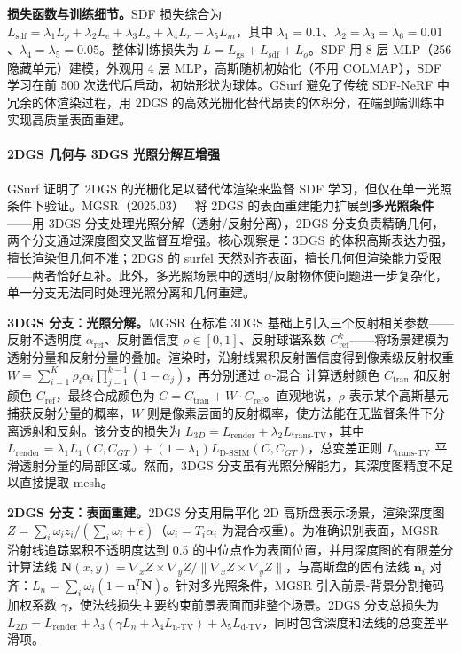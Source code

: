 \textbf{损失函数与训练细节。}SDF 损失综合为 $L_\text{sdf}=\lambda_1 L_p+\lambda_2 L_e+\lambda_3 L_s+\lambda_4 L_r+\lambda_5 L_m$，其中 $\lambda_1=0.1$、$\lambda_2=\lambda_3=\lambda_6=0.01$、$\lambda_4=\lambda_5=0.05$。整体训练损失为 $L=L_\text{gs}+L_\text{sdf}+L_o$。SDF 用 8 层 MLP（256 隐藏单元）建模，外观用 4 层 MLP，高斯随机初始化（不用 COLMAP），SDF 学习在前 500 次迭代后启动，初始形状为球体。GSurf 避免了传统 SDF-NeRF 中冗余的体渲染过程，用 2DGS 的高效光栅化替代昂贵的体积分，在端到端训练中实现高质量表面重建。

\paragraph{2DGS 几何与 3DGS 光照分解互增强}

GSurf 证明了 2DGS 的光栅化足以替代体渲染来监督 SDF 学习，但仅在单一光照条件下验证。MGSR（2025.03）~\cite{2503_05182} 将 2DGS 的表面重建能力扩展到\textbf{多光照条件}——用 3DGS 分支处理光照分解（透射/反射分离），2DGS 分支负责精确几何，两个分支通过深度图交叉监督互增强。核心观察是：3DGS 的体积高斯表达力强，擅长渲染但几何不准；2DGS 的 surfel 天然对齐表面，擅长几何但渲染能力受限——两者恰好互补。此外，多光照场景中的透明/反射物体使问题进一步复杂化，单一分支无法同时处理光照分离和几何重建。

\textbf{3DGS 分支：光照分解。}MGSR 在标准 3DGS 基础上引入三个反射相关参数——反射不透明度 $\alpha_{\text{ref}}$、反射置信度 $\rho \in [0,1]$、反射球谐系数 $C_{\text{ref}}^k$——将场景建模为透射分量和反射分量的叠加。渲染时，沿射线累积反射置信度得到像素级反射权重 $W = \sum_{i=1}^K \rho_i \alpha_i \prod_{j=1}^{k-1}(1-\alpha_j)$，再分别通过 $\alpha$-混合 计算透射颜色 $C_{\text{tran}}$ 和反射颜色 $C_{\text{ref}}$，最终合成颜色为 $C = C_{\text{tran}} + W \cdot C_{\text{ref}}$。直观地说，$\rho$ 表示某个高斯基元捕获反射分量的概率，$W$ 则是像素层面的反射概率，使方法能在无监督条件下分离透射和反射。该分支的损失为 $L_{3D} = L_{\text{render}} + \lambda_2 L_{\text{trans-TV}}$，其中 $L_{\text{render}} = \lambda_1 L_1(C, C_{GT}) + (1-\lambda_1) L_{\text{D-SSIM}}(C, C_{GT})$，总变差正则 $L_{\text{trans-TV}}$ 平滑透射分量的局部区域。然而，3DGS 分支虽有光照分解能力，其深度图精度不足以直接提取 mesh。

\textbf{2DGS 分支：表面重建。}2DGS 分支用扁平化 2D 高斯盘表示场景，渲染深度图 $Z = \sum_i \omega_i z_i / (\sum_i \omega_i + \epsilon)$（$\omega_i = T_i \alpha_i$ 为混合权重）。为准确识别表面，MGSR 沿射线追踪累积不透明度达到 0.5 的中位点作为表面位置，并用深度图的有限差分计算法线 $\mathbf{N}(x,y) = \nabla_x Z \times \nabla_y Z / \|\nabla_x Z \times \nabla_y Z\|$，与高斯盘的固有法线 $\mathbf{n}_i$ 对齐：$L_n = \sum_i \omega_i (1 - \mathbf{n}_i^T \mathbf{N})$。针对多光照条件，MGSR 引入前景-背景分割掩码加权系数 $\gamma$，使法线损失主要约束前景表面而非整个场景。2DGS 分支总损失为 $L_{2D} = L_{\text{render}} + \lambda_3(\gamma L_n + \lambda_4 L_{\text{n-TV}}) + \lambda_5 L_{\text{d-TV}}$，同时包含深度和法线的总变差平滑项。

